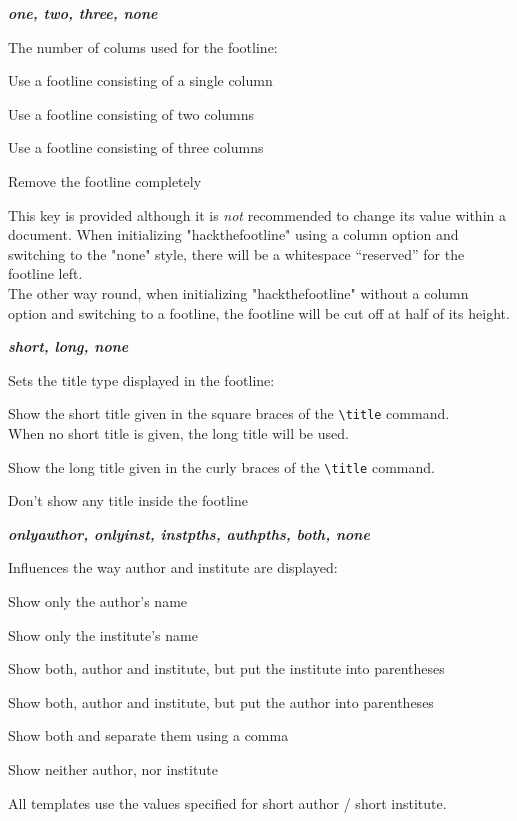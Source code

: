 \documentclass[11pt]{ltxdoc}
\newcommand{\DescribeOption}[3]{
  \DescribeMacro{#1}
  \begin{minipage}[t]{\textwidth}
    \textit{\textbf{#2}}\dotfill~\par
    \begingroup
    \vspace{0.5em}#3\par
    \endgroup
  \end{minipage}%
  \bigskip\medskip%
}
\begin{document}
	\bigskip
	\DescribeOption{cols}{one, two, three, none}{%
		The number of colums used for the footline:
		\begin{description}\itemsep0pt
			\item[one]
				Use a footline consisting of a single column
			\item[two]
				Use a footline consisting of two columns
			\item[three]
				Use a footline consisting of three columns
			\item[none]
				Remove the footline completely
		\end{description}
		This key is provided although it is \emph{not} recommended to change its value within a document.
		When initializing "hackthefootline" using a column option and switching to the "none" style, there will be a whitespace \enquote{reserved} for the footline left. \\
		The other way round, when initializing "hackthefootline" without a column option and switching to a footline, the footline will be cut off at half of its height.
	}
	
	\DescribeOption{title}{short, long, none}{%
		Sets the title type displayed in the footline:
		\begin{description}\itemsep0pt
			\item[short]
				Show the short title given in the square braces of the \texttt{\textbackslash title} command. \\
				When no short title is given, the long title will be used.
			\item[long]
				Show the long title given in the curly braces of the \texttt{\textbackslash title} command.
			\item[none]
				Don't show any title inside the footline
		\end{description}}
	
	\DescribeOption{authinst}{onlyauthor, onlyinst, instpths, authpths, both, none}{%
		Influences the way author and institute are displayed:
		\begin{description}\itemsep0pt
			\item[onlyauthor]
				Show only the author's name
			\item[onlyinst]
				Show only the institute's name
			\item[instpths]
				Show both, author and institute, but put the institute into parentheses
			\item[authpths]
				Show both, author and institute, but put the author into parentheses
			\item[both]
				Show both and separate them using a comma
			\item[none]
				Show neither author, nor institute
		\end{description}
		All templates use the values specified for short author / short institute.
	}
	
\end{document}
